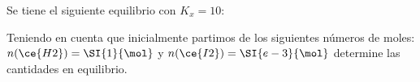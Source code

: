 Se tiene el siguiente equilibrio con $K_x=\num{10}$:\\
\begin{center}
\end{center}
Teniendo en cuenta que inicialmente partimos de los siguientes números de moles: $n(\ce{H2})=\SI{1}{\mol}$ y $n(\ce{I2})=\SI{e-3}{\mol}$ determine las cantidades en equilibrio.
